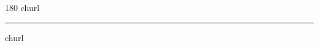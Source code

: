 
\begin{frame}
\begin{center}
\begin{turn}{180}
{\fontsize{2.5cm}{1em}\selectfont churl}
\end{turn}
\vspace{1em}\par  
\hrule
\vspace{1em}\par  
{\fontsize{2.5cm}{1em}\selectfont churl}
\end{center}
\end{frame}
